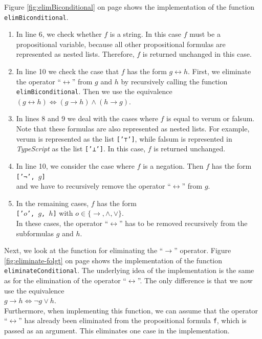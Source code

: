 Figure \ref{fig:elimBiconditional} on page \pageref{fig:elimBiconditional} shows the implementation of the
function \texttt{elimBiconditional}.
\begin{enumerate}
\item In line 6, we check whether $f$ is a string.  In this case
      $f$ must be a propositional variable, because all other propositional formulas are represented as nested lists.
      Therefore, $f$ is returned unchanged in this case.
\item In line 10 we check the case that $f$ has the form $g \leftrightarrow h$.
      First, we eliminate the operator ``$\leftrightarrow$'' from $g$ and $h$ by recursively
      calling the function \texttt{elimBiconditional}.  Then we use the equivalence
      \\[0.2cm]
      \hspace*{1.3cm}
      $(g \leftrightarrow h) \Leftrightarrow (g \rightarrow h) \wedge (h \rightarrow g)$.
\item In lines 8 and 9 we deal with the cases where $f$ is equal to verum or falsum.
      Note that these formulas are also represented as nested lists.
      For example, verum is represented as the list \texttt{['⊤']}, while falsum is represented in
      \textsl{TypeScript} as the list \texttt{['⊥']}.  In this case, $f$
      is returned unchanged.
\item In line 10, we consider the case where $f$ is a negation.  Then $f$ has the form
      \\[0.2cm]
      \hspace*{1.3cm}
      \texttt{['¬', $g$]}  
      \\[0.2cm]
      and we have to recursively remove the operator ``$\leftrightarrow$'' from $g$.
\item In the remaining cases, $f$ has the form
      \\[0.2cm]
      \hspace*{1.3cm}
      \texttt{['$o$', $g$, $h$]}  \quad with $o \in \{\rightarrow, \wedge, \vee\}$.
      \\[0.2cm]
      In these cases, the operator ``$\leftrightarrow$'' has to be removed recursively from the subformulas $g$ and $h$. 
\end{enumerate}
\FloatBarrier

Next, we look at the function for eliminating the ``$\rightarrow$'' operator. 
Figure
\ref{fig:eliminate-folgt} on page \pageref{fig:eliminate-folgt} shows the
implementation of the function
\texttt{eliminateConditional}.
The underlying idea of the implementation is the same as for the elimination of the
operator ``$\leftrightarrow$''.  The only difference is that we now use the
equivalence \\[0.2cm]
\hspace*{1.3cm}
$g \rightarrow h \Leftrightarrow \neg g \vee h$. \\[0.2cm]
Furthermore, when implementing this function, we can assume that the operator ``$\leftrightarrow$''
has already been eliminated from the propositional formula \texttt{f}, which is passed as an argument.
This eliminates one case in the implementation. 



